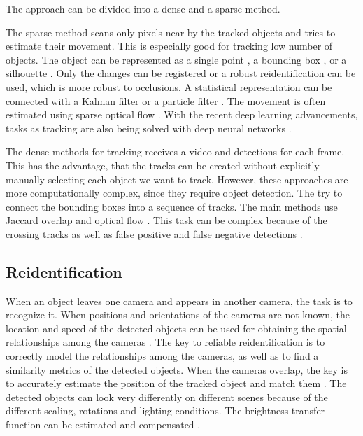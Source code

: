 \documentclass[a4paper,12pt,titlepage]{article}
\numberwithin{figure}{section}
\begin{document}
The approach can be divided into a dense and a sparse method. 

The sparse method scans only pixels near by the tracked objects and tries to estimate their movement. This is especially good for tracking low number of objects. The object can be represented as a single point \cite{kale2015moving}, a bounding box \cite{comaniciu2003kernel, porikli2005multi, yilmaz2007object, elgammal2002background}, or a silhouette \cite{isard2001bramble}. Only the changes can be registered \cite{kale2015moving} or a robust reidentification \cite{veenman1998fast} can be used, which is more robust to occlusions. A statistical representation can be connected with a Kalman filter \cite{banerjee2008multi} or a particle filter \cite{zhong2012moving}. The movement is often estimated using sparse optical flow \cite{kale2015moving, mae1996object}. With the recent deep learning advancements, tasks as tracking are also being solved with deep neural networks \cite{bertinetto2016fully, held2016learning, gladh2016deep, gaidon2016virtual, lee2016globally}.

The dense methods for tracking receives a video and detections for each frame. This has the advantage, that the tracks can be created without explicitly manually selecting each object we want to track. However, these approaches are more computationally complex, since they require object detection. The try to connect the bounding boxes into a sequence of tracks. The main methods use Jaccard overlap \cite{tan2005introduction, benfold2011stable} and optical flow \cite{chen2011tracking}. This task can be complex because of the crossing tracks as well as false positive and false negative detections \cite{joshi2012survey, elgammal2002background}.












\subsection{Reidentification}
When an object leaves one camera and appears in another camera, the task is to recognize it. When positions and orientations of the cameras are not known, the location and speed of the detected objects can be used for obtaining the spatial relationships among the cameras \cite{makris2004bridging}. The key to reliable reidentification is to correctly model the relationships among the cameras, as well as to find a similarity metrics of the detected objects. When the cameras overlap, the key is to accurately estimate the position of the tracked object and match them \cite{khan2003consistent, krumm2000multi, zhao2005real}. The detected objects can look very differently on different scenes because of the different scaling, rotations and lighting conditions. The brightness transfer function can be estimated and compensated \cite{javed2005appearance, porikli2003inter}. 
\end{document}
